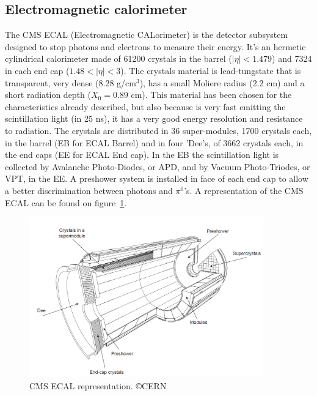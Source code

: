 \subsection{Electromagnetic calorimeter}
\label{sec:ecal}

The CMS ECAL (Electromagnetic CALorimeter) is the detector subsystem designed to stop photons and electrons to measure their energy. It's an hermetic cylindrical calorimeter made of 61200 crystals in the barrel ($|\eta|<1.479$) and 7324 in each end cap ($1.48<|\eta|<3$). The crystals material is lead-tungstate that is transparent, very dense (8.28 g/$\text{cm}^{3}$), has a small Moliere radius (2.2 cm) and a short radiation depth ($X_{0}=0.89$ cm). This material has been chosen for the characteristics already described, but also because is very fast emitting the scintillation light (in 25 ns), it has a very good energy resolution and resistance to radiation. The crystals are distributed in 36 super-modules, 1700 crystals each, in the barrel (EB for ECAL Barrel) and in four 'Dee's, of 3662 crystals each, in the end caps (EE for ECAL End cap). In the EB the scintillation light is collected by Avalanche Photo-Diodes, or APD, and by Vacuum Photo-Triodes, or VPT, in the EE. A preshower system is installed in face of each end cap to allow a better discrimination between photons and $\pi^{0}$'s. A representation of the CMS ECAL can be found on figure~\ref{fig:ecal}.

\begin{figure}[!Hhtbp]
  \begin{center}
    \includegraphics[width=0.9\textwidth]{figs/ECAL.png}
    \caption{CMS ECAL representation. \copyright CERN}
    \label{fig:ecal}
  \end{center}
\end{figure}


